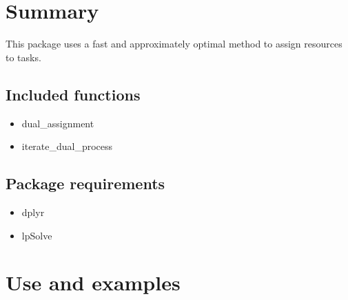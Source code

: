 \documentclass[12pt]{article}
\begin{document}
\maketitle

\section{Summary}
This package uses a fast and approximately optimal method to assign resources to tasks.
\subsection{Included functions}
\begin{itemize}
\item dual\_assignment
\item iterate\_dual\_process
\end{itemize}
\subsection{Package requirements}
\begin{itemize}
\item dplyr
\item lpSolve
\end{itemize}

\section{Use and examples}
\end{document}
